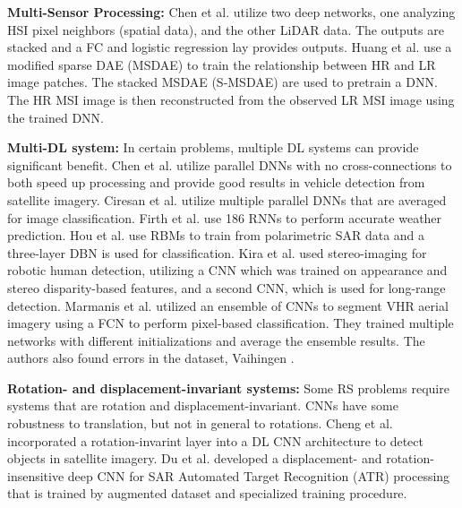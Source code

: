 \documentclass[12pt]{spieman}
\begin{document}
\begin{spacing}{1}
%
%
\textbf{Multi-Sensor Processing:} Chen et al. \cite{Chen2016DeepFusion} utilize two deep networks, one analyzing HSI pixel neighbors (spatial data), and the other LiDAR data. The outputs are stacked and a FC and logistic regression lay provides outputs. Huang et al. \cite{huang2015new} use a modified sparse DAE (MSDAE) to train the relationship between HR and LR image patches. The stacked MSDAE (S-MSDAE) are used to pretrain a DNN. The HR MSI image is then reconstructed from the observed LR MSI image using the trained DNN.


%
%
\textbf{Multi-DL system:} In certain problems, multiple DL systems can provide significant benefit. Chen et al. \cite{chen2014vehicle} utilize parallel DNNs with no cross-connections to both speed up processing and provide good results in vehicle detection from satellite imagery. Ciresan et al. \cite{Ciresan2012} utilize multiple parallel DNNs that are averaged for image classification. Firth et al. \cite{firth2016novel} use 186 RNNs to perform accurate weather prediction. Hou et al. \cite{Hou2015Polarimetric} use RBMs to train from polarimetric SAR data and a three-layer DBN is used for classification. Kira et al. \cite{Kira2012} used stereo-imaging for robotic human detection, utilizing a CNN which was trained on appearance and stereo disparity-based features, and a second CNN, which is used for long-range detection. Marmanis et al. \cite{Marmanis2016Semantic} utilized an ensemble of CNNs to segment VHR aerial imagery using a FCN to perform pixel-based classification. They trained multiple networks with different initializations and average the ensemble results. The authors also found errors in the dataset, Vaihingen \cite{rottensteiner2012isprs} . 


%
%
\textbf{Rotation- and displacement-invariant systems:} Some RS problems require systems that are rotation and displacement-invariant. CNNs have some robustness to translation, but not in general to rotations. Cheng et al. \cite{Cheng2016Learning} incorporated a rotation-invarint layer into a DL CNN architecture to detect objects in satellite imagery. Du et al. \cite{du2016sar} developed a displacement- and rotation-insensitive deep CNN for SAR Automated Target Recognition (ATR) processing that is trained by augmented dataset and specialized training procedure.



\end{spacing}
\end{document}
